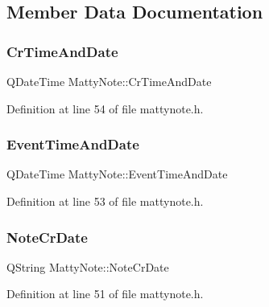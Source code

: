 \subsection{Member Data Documentation}
\hypertarget{classMattyNote_a2997065dc8e32e25c98e2190b4a439b6}{}\label{classMattyNote_a2997065dc8e32e25c98e2190b4a439b6} 
\subsubsection{\texorpdfstring{Cr\+Time\+And\+Date}{CrTimeAndDate}}
{\footnotesize\ttfamily Q\+Date\+Time Matty\+Note\+::\+Cr\+Time\+And\+Date\hspace{0.3cm}{\ttfamily [private]}}



Definition at line 54 of file mattynote.\+h.

\hypertarget{classMattyNote_a7fa3236dd5812ad1a139bad8d50d28b2}{}\label{classMattyNote_a7fa3236dd5812ad1a139bad8d50d28b2} 
\subsubsection{\texorpdfstring{Event\+Time\+And\+Date}{EventTimeAndDate}}
{\footnotesize\ttfamily Q\+Date\+Time Matty\+Note\+::\+Event\+Time\+And\+Date\hspace{0.3cm}{\ttfamily [private]}}



Definition at line 53 of file mattynote.\+h.

\hypertarget{classMattyNote_a3b94a4b062d2c2335f410f252210ed20}{}\label{classMattyNote_a3b94a4b062d2c2335f410f252210ed20} 
\subsubsection{\texorpdfstring{Note\+Cr\+Date}{NoteCrDate}}
{\footnotesize\ttfamily Q\+String Matty\+Note\+::\+Note\+Cr\+Date\hspace{0.3cm}{\ttfamily [private]}}



Definition at line 51 of file mattynote.\+h.

